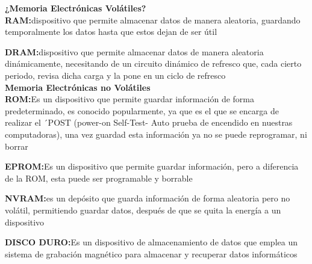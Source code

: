 \documentclass{article}
\begin{document}
\textbf{¿Memoria Electrónicas Volátiles?}
\\[2ex]
\textbf{RAM:}dispositivo que permite almacenar datos de manera aleatoria, guardando temporalmente los datos hasta que estos dejan de ser útil

\textbf{DRAM:}dispositivo que permite almacenar datos de manera aleatoria dinámicamente, necesitando de un circuito dinámico de refresco que, cada cierto periodo, revisa dicha carga y la pone en un ciclo de refresco
\\[2ex]
\textbf{Memoria Electrónicas no Volátiles}
\\[2ex]
\textbf{ROM:}Es un dispositivo que permite guardar información de forma predeterminado, es conocido popularmente, ya que es el que se encarga de realizar el ´POST (power-on Self-Test- Auto prueba de encendido en nuestras computadoras), una vez guardad esta información ya no se puede reprogramar, ni borrar

\textbf{EPROM:}Es un dispositivo que permite guardar información, pero a diferencia de la ROM, esta puede ser programable y borrable

\textbf{NVRAM:}es un depósito que guarda información de forma aleatoria pero no volátil, permitiendo guardar datos, después de que se quita la energía a un dispositivo 

\textbf{DISCO DURO:}Es un dispositivo de almacenamiento de datos que emplea un sistema de grabación magnético para almacenar y recuperar datos informáticos
\end{document}
